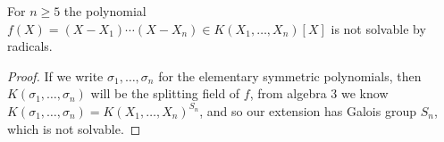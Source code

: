 \documentclass{article}
\begin{document}
\begin{corollary}
    For $n\geq 5$ the polynomial $f(X) = (X-X_1)\cdots (X-X_n)\in K(X_1,\ldots,X_n)[X]$ is not solvable by radicals.
    \begin{proof}
        If we write $\sigma_1,\ldots,\sigma_n$ for the elementary symmetric polynomials, then $K(\sigma_1,\ldots,\sigma_n)$ will be the splitting field of $f$, from algebra 3 we know $K(\sigma_1,\ldots,\sigma_n) = K(X_1,\ldots,X_n)^{S_n}$, and so our extension has Galois group $S_n$, which is not solvable.
    \end{proof}
\end{corollary}
\end{document}
